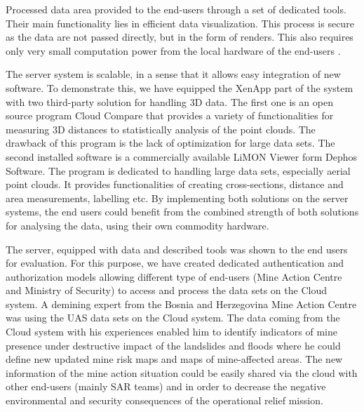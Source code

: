 \documentclass{article}
\begin{document}
Processed data area provided to the end-users through a set of dedicated tools. Their main functionality lies in efficient data visualization. This process is secure as the data are not passed directly, but in the form of renders. This also requires only very small computation power from the local hardware of the end-users .

The server system is scalable, in a sense that it allows easy integration of new software. To demonstrate this, we have equipped the XenApp part of the system with two third-party solution for handling 3D data. The first one is an open source program Cloud Compare that provides a variety of functionalities for measuring 3D distances to statistically analysis of the point clouds. The drawback of this program is the lack of optimization for large data sets. The second installed software is a commercially available LiMON Viewer form Dephos Software. The program is dedicated to handling large data sets, especially aerial point clouds. It provides functionalities of creating cross-sections, distance and area measurements, labelling etc. By implementing both solutions on the server systems, the end users could benefit from the combined strength of both solutions for analysing the data, using their own commodity hardware.
	
The server, equipped with data and described tools was shown to the end users for evaluation. For this purpose, we have created dedicated authentication and authorization models allowing different type of end-users (Mine Action Centre and Ministry of Security) to access and process the data sets on the Cloud system. A demining expert from the Bosnia and Herzegovina Mine Action Centre was using the UAS data sets on the Cloud system. The data coming from the Cloud system with his experiences enabled him to identify indicators of mine presence under destructive impact of the landslides and floods where he could define new updated mine risk maps and maps of mine-affected areas. The new information of the mine action situation could be easily shared via the cloud with other end-users (mainly SAR teams) and in order to decrease the negative environmental and security consequences of the operational relief mission.
\end{document}
